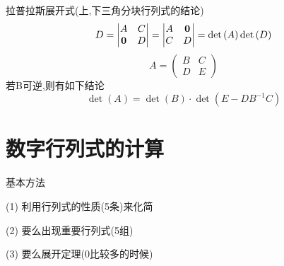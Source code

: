 \documentclass[12pt, a4paper, oneside, UTF8]{ctexbook}
\begin{document}
拉普拉斯展开式(上,下三角分块行列式的结论)
$$
D = 
\begin{vmatrix}
A & C \\
\mathbf{0}& D  
\end{vmatrix} 
= \begin{vmatrix}
A & \mathbf{0} \\
C & D
\end{vmatrix}
= \det{(A)}\det{(D)} \\
$$
$$
A = \begin{pmatrix}
B & C \\
D & E
\end{pmatrix} 
$$
若B可逆,则有如下结论
$$
\det(A) = \det(B) \cdot \det(E - D B^{-1} C)
$$

\section{数字行列式的计算}
\begin{remark}
    基本方法
    \item [(1)]利用行列式的性质(5条)来化简
    \item [(2)] 要么出现重要行列式(5组) 
    \item [(3)] 要么展开定理(0比较多的时候)
\end{remark}
\end{document}
